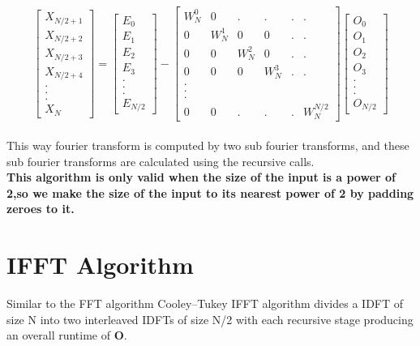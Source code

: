 \documentclass[journal,12pt,twocolumn]{IEEEtran}
\begin{document}
\begin{equation}
\begin{bmatrix}
X_{N/2+1} \\
X_{N/2+2} \\
X_{N/2+3} \\
X_{N/2+4} \\
. \\
. \\
. \\
X_{N}
\end{bmatrix}
= 
\begin{bmatrix}
E_{0} \\
E_{1} \\
E_{2} \\
E_{3} \\
. \\
. \\
. \\
E_{N/2}
\end{bmatrix}
-
\begin{bmatrix}
W^{0}_{N} & 0  &. &. &.&. \\
0 & W^{1}_{N} & 0 & 0 &. &. \\
0 & 0 & W^{2}_{N} & 0 &. &. \\
0 & 0 & 0 & W^{3}_{N} &. &.\\
.\\
.\\
.\\
0 & 0 &. &.&. &W^{N/2}_{N}
\end{bmatrix}
\begin{bmatrix}
O_{0} \\
O_{1} \\
O_{2} \\
O_{3} \\
. \\
. \\
. \\
O_{N/2}
\end{bmatrix}
\end{equation}
\\
This way fourier transform is computed by two sub fourier transforms, and these sub fourier transforms are calculated using the recursive calls.
\\
\textbf{This algorithm is only valid when the size of the input is a power of 2,so we make the size of the input to its nearest power of 2 by padding zeroes to it.}


\section{IFFT Algorithm}
Similar to the FFT algorithm Cooley–Tukey IFFT algorithm divides a IDFT of size N into two interleaved IDFTs of size N/2 with each recursive stage producing an overall runtime of \textbf{O}.
\\
\end{document}
